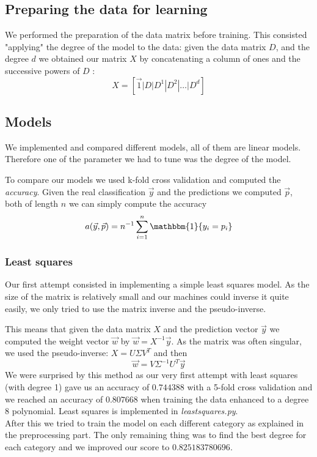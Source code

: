 \documentclass[10pt,conference,compsocconf]{IEEEtran}
\begin{document}
\subsection{Preparing the data for learning}
We performed the preparation of the data matrix before training. This consisted "applying" the degree of the model to the data: given the data matrix $D$, and the degree $d$ we obtained our matrix $X$ by concatenating a column of ones and the successive powers of $D$ : $$X = [\vec{1} | D | D^1 | D^2 | \dots | D^d]$$

\subsection{Models}
We implemented and compared different models, all of them are linear models. Therefore one of the parameter we had to tune was the degree of the model.

To compare our models we used k-fold cross validation and computed the \textit{accuracy}. Given the real classification $\vec{y}$ and the predictions we computed $\vec{p}$, both of length $n$ we can simply compute the accuracy $$a(\vec{y}, \vec{p}) = n^{-1}\sum_{i=1}^n \mathbbm{1}\{y_i = p_i\}$$

\subsubsection{Least squares}
Our first attempt consisted in implementing a simple least squares model. As the size of the matrix is relatively small and our machines could inverse it quite easily, we only tried to use the matrix inverse and the pseudo-inverse.

This means that given the data matrix $X$ and the prediction vector $\vec{y}$ we computed the weight vector $\vec{w}$ by
$\vec{w} = X^{-1} \vec{y}$. As the matrix was often singular, we used the pseudo-inverse: $X = U \Sigma V^T$ and then
$$\vec{w} = V \Sigma^{-1} U^T \vec{y}$$
We were surprised by this method as our very first attempt with least squares (with degree 1) gave us an accuracy of $0.744388$ with a 5-fold cross validation and we reached an accuracy of $0.807668$ when training the data enhanced to a degree 8 polynomial. 
Least squares is implemented in \textit{leastsquares.py}.\\
After this we tried to train the model on each different category as explained in the preprocessing part. The only remaining thing was to find the best degree for each category and we improved our score to $0.825183780696$. 
\end{document}
